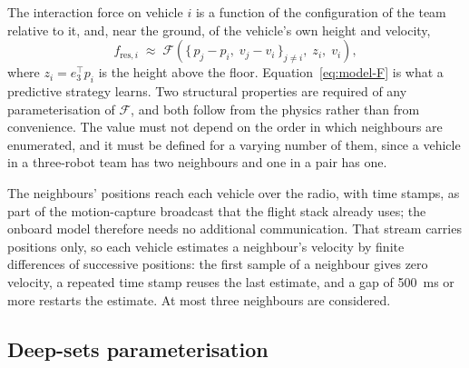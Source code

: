 The interaction force on vehicle $i$ is a function of the configuration of the team relative to it,
and, near the ground, of the vehicle's own height and velocity,
%
\begin{equation}
  f_{\mathrm{res},i} \;\approx\; \mathcal{F}\!\left( \{\, p_j - p_i,\; v_j - v_i \,\}_{j \neq i},\; z_i,\; v_i \right),
  \label{eq:model-F}
\end{equation}
%
where $z_i = e_3^\top p_i$ is the height above the floor. Equation~\eqref{eq:model-F} is what a
predictive strategy learns. Two structural properties are required
of any parameterisation of $\mathcal{F}$, and both follow from the physics rather than from
convenience. The value must not depend on the order in which neighbours are enumerated, and it must
be defined for a varying number of them, since a vehicle in a three-robot team has two neighbours
and one in a pair has one.

The neighbours' positions reach each vehicle over the radio, with time stamps, as part of the
motion-capture broadcast that the flight stack already uses; the onboard model therefore needs no
additional communication. That stream carries positions only, so each vehicle estimates a
neighbour's velocity by finite differences of successive positions: the first sample of a neighbour
gives zero velocity, a repeated time stamp reuses the last estimate, and a gap of
\SI{500}{\milli\second} or more restarts the estimate. At most three neighbours are considered.

\subsection{Deep-sets parameterisation}

